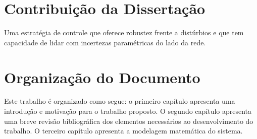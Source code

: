

\section*{Contribuição da Dissertação}

	Uma estratégia de controle que oferece robustez frente a distúrbios e que
	tem capacidade de lidar com incertezas paramétricas do lado da rede.

\section*{Organização do Documento}

	Este trabalho é organizado como segue: o primeiro capítulo apresenta uma introdução
	e motivação para o trabalho proposto. O segundo capítulo apresenta uma breve revisão
	bibliográfica dos elementos necessários ao desenvolvimento do trabalho. O terceiro
	capítulo apresenta a modelagem matemática do sistema.

